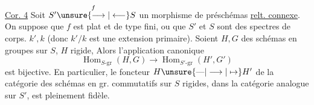 \uline{Cor. 4} Soit $S'\overset{f}{\unsure{\longrightarrow|\longleftarrow}}S$ un morphisme de
préschémas \uline{relt. connexe}. On suppose que
\margin{\rule[-6\baselineskip]{0.35pt}{6\baselineskip}}$f$ est  plat et de type fini, ou que
$S'$ et $S$ sont des spectres de corps. 
 $k',k$ (donc $k'/k$ est une extension
primaire).  Soient
 $H,G$ des schémas en
groupes   sur $S$, $H$  rigide,
Alors l'application canonique
\[
\operatorname{Hom}_{S\text{-}\mathrm{gr}}(H,G)\longrightarrow\operatorname{Hom}_{S'\text{-}\mathrm{gr}}(H',G')
\]
est bijective. En particulier, le
foncteur $H\unsure{\text{---}|\longrightarrow|\mapsto}H'$ de la catégorie
\margin{\rule[-3\baselineskip]{0.35pt}{3\baselineskip}}des schémas en gr. commutatifs 
sur $S$  rigides, dans la catégorie
analogue sur $S'$, est pleinement fidèle.
